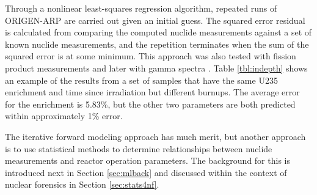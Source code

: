 Through a nonlinear least-squares regression algorithm, repeated runs of
\gls{ORIGEN-ARP} are carried out given an initial guess. The squared error
residual is calculated from comparing the computed nuclide measurements against
a set of known nuclide measurements, and the repetition terminates when the sum
of the squared error is at some minimum.  \cite{weber_2006} This approach was
also tested with fission product measurements \cite{weber_2010} and later with
gamma spectra \cite{weber_2011}. Table \ref{tbl:indepth} shows an example of
the results from a set of samples that have the same \gls{U235} enrichment and
time since irradiation but different burnups.  The average error for the
enrichment is 5.83\%, but the other two parameters are both predicted within
approximately 1\% error. 

The iterative forward modeling approach has much merit, but another approach is
to use statistical methods to determine relationships between nuclide
measurements and reactor operation parameters. The background for this is
introduced next in Section \ref{sec:mlback} and discussed within the context of
nuclear forensics in Section \ref{sec:stats4nf}.

%


